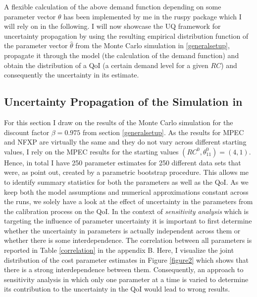 A flexible calculation of the above demand function depending on some parameter vector $\theta$ has been implemented by me in the ruspy package which I will rely on in the following. I will now showcase the UQ framework for uncertainty propagation by using the resulting empirical distribution function of the parameter vector $\hat\theta$ from the Monte Carlo simulation in \ref{generalsetup}, propagate it through the model (the calculation of the demand function) and obtain the distribution of a QoI (a certain demand level for a given $RC$) and consequently the uncertainty in its estimate.

\subsection{Uncertainty Propagation of the Simulation in \cite{Iskhakov.2016}}

For this section I draw on the results of the Monte Carlo simulation for the discount factor $\beta=0.975$ from section \ref{generalsetup}. As the results for MPEC and NFXP are virtually the same and they do not vary across different starting values, I rely on the MPEC results for the starting values $(RC^0, \theta^0_{11}) = (4,1)$. Hence, in total I have 250 parameter estimates for 250 different data sets that were, as \cite{Su.Judd.2012} point out, created by a parametric bootstrap procedure. This allows me to identify summary statistics for both the parameters as well as the QoI. As we keep both the model assumptions and numerical approximations constant across the runs, we solely have a look at the effect of uncertainty in the parameters from the calibration process on the QoI. In the context of \textit{sensitivity analysis} which is targeting the influence of parameter uncertainty it is important to first determine whether the uncertainty in parameters is actually independent across them or whether there is some interdependence. The correlation between all parameters is reported in Table \ref{correlation} in the appendix B. Here, I visualize the joint distribution of the cost parameter estimates in Figure \ref{figure2} which shows that there is a strong interdependence between them. Consequently, an approach to sensitivity analysis in which only one parameter at a time is varied to determine its contribution to the uncertainty in the QoI would lead to wrong results.

